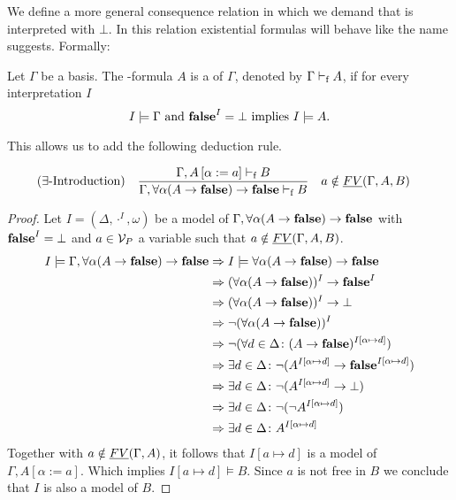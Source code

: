 We define a more general consequence relation in which we demand that \false{} is interpreted with $\bot$. In this relation existential formulas will behave like the name suggests. Formally:
\begin{definition}
Let $\Gamma$ be a basis. The \SysP-formula $A$ is a  of $\Gamma$, denoted by $\Gamma\vdash_\text{f} A$, if for every interpretation $I$
\[I\models\Gamma \text{ and } \textbf{false}^I=\bot\text{ implies }I\models A.\]

This allows us to add the following deduction rule.
\begin{mdframed}
	\begin{align*}
		  & (\exists\text{-Introduction}) &   & \frac 
		{\Gamma,A\left[\alpha:=a\right]\vdash_\text{f} B}
		{\Gamma,\forall\alpha(A\to\textbf{false})\to\textbf{false}\vdash_\text{f} B} && a\notin\emph{FV}(\Gamma,A,B)
	\end{align*}
\end{mdframed}
\end{definition}
\begin{proof}
	Let $I=(\Delta,\cdot^I,\omega)$ be a model of $\Gamma,\forall\alpha(A\to\textbf{false})\to\textbf{false}$ with $\textbf{false}^I=\bot$ and $a\in\mathcal{V}_P$ a variable such that $a\notin\emph{FV}(\Gamma,A,B)$.
	\begin{align*}
		I\models\Gamma,\forall\alpha(A\to\textbf{false})\to\textbf{false} & \Rightarrow I\models\forall\alpha(A\to\textbf{false})\to\textbf{false}                                                          \\
        & \Rightarrow (\forall\alpha(A\to\textbf{false}))^I\to\textbf{false}^I                                                            \\
        & \Rightarrow (\forall\alpha(A\to\textbf{false}))^I\to\bot                                                                \\
        & \Rightarrow \neg(\forall\alpha(A\to\textbf{false}))^I                                                                   \\
        & \Rightarrow \neg(\forall d\in\Delta\colon(A\to\textbf{false})^{I\left[\alpha\mapsto d\right]})                               \\
        & \Rightarrow \exists d\in\Delta\colon\neg(A^{I\left[\alpha\mapsto d\right]}\to\textbf{false}^{I\left[\alpha\mapsto d\right]}) \\
        & \Rightarrow \exists d\in\Delta\colon\neg(A^{I\left[\alpha\mapsto d\right]}\to\bot)                                   \\
        & \Rightarrow \exists d\in\Delta\colon\neg(\neg A^{I\left[\alpha\mapsto d\right]})                                     \\
        & \Rightarrow \exists d\in\Delta\colon A^{I\left[\alpha\mapsto d\right]}
	\end{align*}
	Together with $a\notin\emph{FV}(\Gamma,A)$, it follows that $I\left[a\mapsto d\right]$ is a model of $\Gamma,A\left[\alpha:=a\right]$. Which implies $I\left[a\mapsto d\right]\models B$.	Since $a$ is not free in $B$ we conclude that $I$ is also a model of $B$.
\end{proof}
